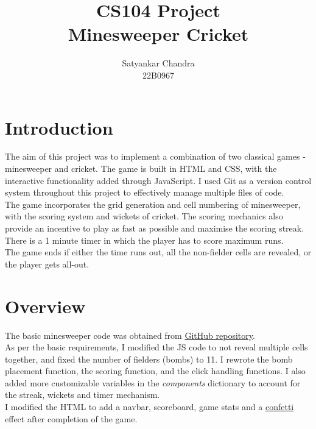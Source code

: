 \documentclass{article}
\begin{document}

\title{\textbf{CS104 Project \\ Minesweeper Cricket}}
\date{}
\author{Satyankar Chandra \\ 22B0967}
\maketitle
\tableofcontents
\clearpage
\pagestyle{fancy}
\section{Introduction}
The aim of this project was to implement a combination of two classical games - minesweeper and cricket. The game is built in HTML and CSS, with the interactive functionality added through JavaScript. I used Git as a version control system throughout this project to effectively manage multiple files of code.\\

\noindent
The game incorporates the grid generation and cell numbering of minesweeper, with the scoring system and wickets of cricket. The scoring mechanics also provide an incentive to play as fast as possible and maximise the scoring streak. There is a 1 minute timer in which the player has to score maximum runs. \\

\noindent
The game ends if either the time runs out, all the non-fielder cells are revealed, or the player gets all-out.

\section{Overview}
The basic minesweeper code was obtained from \href{https://arghac14.github.io/Minesweeper/}{GitHub repository}. \\

As per the basic requirements, I modified the JS code to not reveal multiple cells together, and fixed the number of fielders (bombs) to 11. I rewrote the bomb placement function, the scoring function, and the click handling functions. I also added more customizable variables in the \textit{components} dictionary to account for the streak, wickets and timer mechanism. \\

I modified the HTML to add a navbar, scoreboard, game stats and a \href{https://www.cssscript.com/confetti-falling-animation/}{confetti} effect after completion of the game. \\
\end{document}
